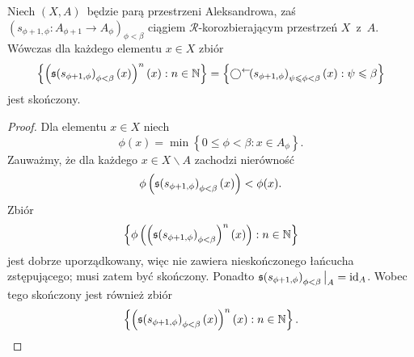 \begin{lem}\label{lem-iteracje_s_na_x_tworza_skonczony_zbior}
Niech $(X,A)$~będzie parą przestrzeni Aleksandrowa, zaś $\left(s_{\phi+1,\phi}\colon A_{\phi+1}\to A_{\phi}\right)_{\phi<\beta}$ ciągiem $\mathcal{R}$-korozbierającym przestrzeń $X$~z~$A$. Wówczas dla każdego elementu $x\in X$ zbiór \[\left\{\left(\mathfrak{s}\!\left(s_{\phi+1,\phi}\right)_{\phi<\beta}(x)\right)^n(x):n\in\mathbb{N}\right\}=\left\{\bigcirc^\leftarrow\!\!\left(s_{\phi+1,\phi}\right)_{\psi\leqslant \phi<\beta}(x):\psi\leqslant\beta \right\}\] jest skończony.
\end{lem}
\begin{proof}
Dla elementu $x\in X$ niech \[\phi(x)=\min\left\{0\leq \phi<\beta:x\in A_{\phi}\right\}.\] 
Zauważmy, że dla każdego $x\in X\smallsetminus A$ zachodzi nierówność \[\phi\left(\mathfrak{s}\!\left(s_{\phi+1,\phi}\right)_{\phi<\beta}(x)\right)< \phi(x).\] Zbiór \[\left\{\phi\left(\left(\mathfrak{s}\!\left(s_{\phi+1,\phi}\right)_{\phi<\beta}\right)^n(x)\right):n\in\mathbb{N}\right\}\] jest dobrze uporządkowany, więc nie zawiera nieskończonego łańcucha zstępującego; musi zatem być skończony. Ponadto $\mathfrak{s}\!\left(s_{\phi+1,\phi}\right)_{\phi<\beta}\big|_A=\operatorname{id}_A$. Wobec tego skończony jest również zbiór \[\left\{\left(\mathfrak{s}\!\left(s_{\phi+1,\phi}\right)_{\phi<\beta}(x)\right)^n(x):n\in\mathbb{N}\right\}.\qedhere\]
\end{proof}

